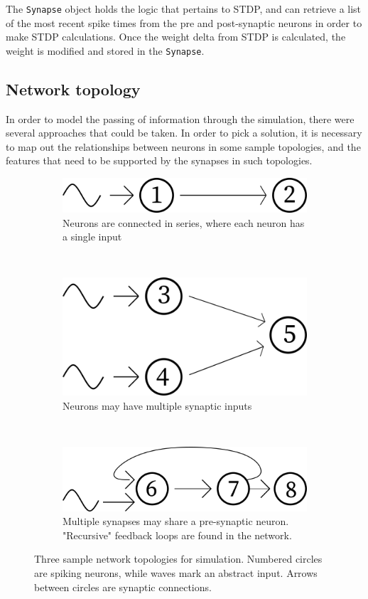 The \texttt{Synapse} object holds the logic that pertains to STDP, and can
retrieve a list of the most recent spike times from the pre and post-synaptic
neurons in order to make STDP calculations. Once the weight delta from STDP is
calculated, the weight is modified and stored in the \texttt{Synapse}.

\FloatBarrier

\subsection{Network topology}

In order to model the passing of information through the simulation, there were
several approaches that could be taken. In order to pick a solution, it is
necessary to map out the relationships between neurons in some sample topologies,
and the features that need to be supported by the synapses in such topologies. 

\begin{figure}[h!]
    \begin{subfigure}{1\textwidth}
        \centering
        \includegraphics[width=0.4\linewidth]{figures/tops/top1.png}
        \caption{Neurons are connected in series, where each neuron has a single input}
        \label{fig:top1}
    \end{subfigure} \vspace{1ex} \\ 
    \begin{subfigure}{1\textwidth}
        \centering
        \includegraphics[width=0.4\linewidth]{figures/tops/top2.png}
        \caption{Neurons may have multiple synaptic inputs}
        \label{fig:top2}
    \end{subfigure} \vspace{1ex} \\
    \begin{subfigure}{1\textwidth}
        \centering
        \includegraphics[width=0.4\linewidth]{figures/tops/top3.png}
        \caption{Multiple synapses may share a pre-synaptic neuron. "Recursive" feedback loops are found in the network.}
        \label{fig:top3}
    \end{subfigure}
    \vspace{1ex}
    \caption[Sample network topologies for simulation]{Three sample network topologies for simulation. Numbered circles are spiking neurons, while waves mark an abstract input. Arrows between circles are synaptic connections.}
    \label{fig:tops}
\end{figure}

